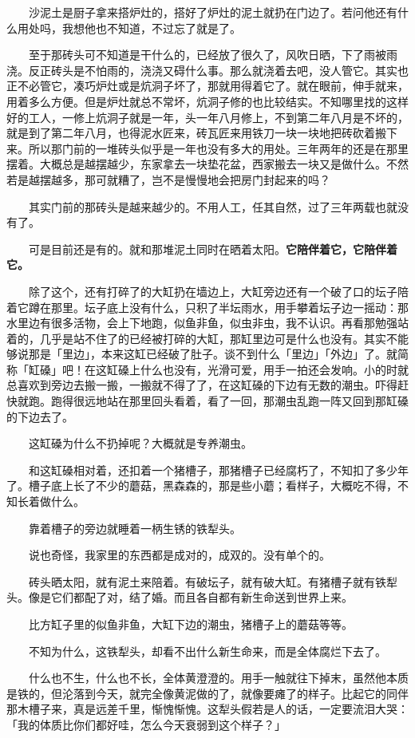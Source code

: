 \documentclass[UTF8]{ctexart}
\begin{document}
　　沙泥土是厨子拿来搭炉灶的，搭好了炉灶的泥土就扔在门边了。若问他还有什么用处吗，我想他也不知道，不过忘了就是了。

　　至于那砖头可不知道是干什么的，已经放了很久了，风吹日晒，下了雨被雨浇。反正砖头是不怕雨的，浇浇又碍什么事。那么就浇着去吧，没人管它。其实也正不必管它，凑巧炉灶或是炕洞子坏了，那就用得着它了。就在眼前，伸手就来，用着多么方便。但是炉灶就总不常坏，炕洞子修的也比较结实。不知哪里找的这样好的工人，一修上炕洞子就是一年，头一年八月修上，不到第二年八月是不坏的，就是到了第二年八月，也得泥水匠来，砖瓦匠来用铁刀一块一块地把砖砍着搬下来。所以那门前的一堆砖头似乎是一年也没有多大的用处。三年两年的还是在那里摆着。大概总是越摆越少，东家拿去一块垫花盆，西家搬去一块又是做什么。不然若是越摆越多，那可就糟了，岂不是慢慢地会把房门封起来的吗？

　　其实门前的那砖头是越来越少的。不用人工，任其自然，过了三年两载也就没有了。

　　可是目前还是有的。就和那堆泥土同时在晒着太阳。\textbf{它陪伴着它，它陪伴着它。}

　　除了这个，还有打碎了的大缸扔在墙边上，大缸旁边还有一个破了口的坛子陪着它蹲在那里。坛子底上没有什么，只积了半坛雨水，用手攀着坛子边一摇动：那水里边有很多活物，会上下地跑，似鱼非鱼，似虫非虫，我不认识。再看那勉强站着的，几乎是站不住了的已经被打碎的大缸，那缸里边可是什么也没有。其实不能够说那是「里边」，本来这缸已经破了肚子。谈不到什么「里边」「外边」了。就简称「缸磉」吧！在这缸磉上什么也没有，光滑可爱，用手一拍还会发响。小的时就总喜欢到旁边去搬一搬，一搬就不得了了，在这缸磉的下边有无数的潮虫。吓得赶快就跑。跑得很远地站在那里回头看着，看了一回，那潮虫乱跑一阵又回到那缸磉的下边去了。

　　这缸磉为什么不扔掉呢？大概就是专养潮虫。

　　和这缸磉相对着，还扣着一个猪槽子，那猪槽子已经腐朽了，不知扣了多少年了。槽子底上长了不少的蘑菇，黑森森的，那是些小蘑；看样子，大概吃不得，不知长着做什么。

　　靠着槽子的旁边就睡着一柄生锈的铁犁头。

　　说也奇怪，我家里的东西都是成对的，成双的。没有单个的。

　　砖头晒太阳，就有泥土来陪着。有破坛子，就有破大缸。有猪槽子就有铁犁头。像是它们都配了对，结了婚。而且各自都有新生命送到世界上来。

　　比方缸子里的似鱼非鱼，大缸下边的潮虫，猪槽子上的蘑菇等等。

　　不知为什么，这铁犁头，却看不出什么新生命来，而是全体腐烂下去了。

　　什么也不生，什么也不长，全体黄澄澄的。用手一触就往下掉末，虽然他本质是铁的，但沦落到今天，就完全像黄泥做的了，就像要瘫了的样子。比起它的同伴那木槽子来，真是远差千里，惭愧惭愧。这犁头假若是人的话，一定要流泪大哭：「我的体质比你们都好哇，怎么今天衰弱到这个样子？」
\end{document}
